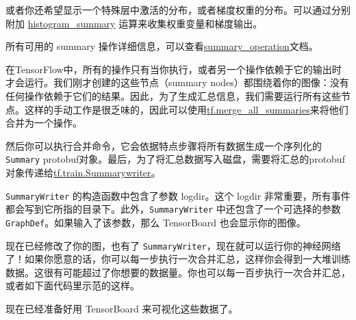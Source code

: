 或者你还希望显示一个特殊层中激活的分布，或者梯度权重的分布。可以通过分别附加
\href{../api_docs/python/train.md\#histogram_summary}{histogram\_summary}
运算来收集权重变量和梯度输出。

所有可用的 summary
操作详细信息，可以查看\href{../api_docs/python/train.md\#summary_operation}{summary\_operation}文档。

在TensorFlow中，所有的操作只有当你执行，或者另一个操作依赖于它的输出时才会运行。我们刚才创建的这些节点（summary
nodes）都围绕着你的图像：没有任何操作依赖于它们的结果。因此，为了生成汇总信息，我们需要运行所有这些节点。这样的手动工作是很乏味的，因此可以使用\href{../api_docs/python/train.md\#scalary_summary}{tf.merge\_all\_summaries}来将他们合并为一个操作。

然后你可以执行合并命令，它会依据特点步骤将所有数据生成一个序列化的\texttt{Summary}
protobuf对象。最后，为了将汇总数据写入磁盘，需要将汇总的protobuf对象传递给\href{../api_docs/python/train.md\#SummaryWriter}{tf.train.Summarywriter}。

\texttt{SummaryWriter} 的构造函数中包含了参数 logdir。这个 logdir
非常重要，所有事件都会写到它所指的目录下。此外，\texttt{SummaryWriter}
中还包含了一个可选择的参数 \texttt{GraphDef}。如果输入了该参数，那么
TensorBoard 也会显示你的图像。

现在已经修改了你的图，也有了
\texttt{SummaryWriter}，现在就可以运行你的神经网络了！如果你愿意的话，你可以每一步执行一次合并汇总，这样你会得到一大堆训练数据。这很有可能超过了你想要的数据量。你也可以每一百步执行一次合并汇总，或者如下面代码里示范的这样。

\begin{Shaded}
\end{Shaded}

现在已经准备好用 TensorBoard 来可视化这些数据了。

